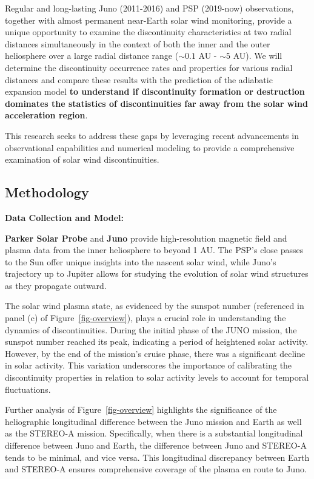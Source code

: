 \documentclass[
  letterpaper,
  DIV=11,
  numbers=noendperiod]{scrartcl}
\begin{document}
Regular and long-lasting Juno (2011-2016) and PSP (2019-now) observations, together with almost permanent near-Earth solar wind monitoring, provide a unique opportunity to examine the discontinuity characteristics at two radial distances simultaneously in the context of both the inner and the outer heliosphere over a large radial distance range (\(\sim 0.1\) AU - \(\sim 5\) AU). We will determine the discontinuity occurrence rates and properties for various radial distances and compare these results with the prediction of the adiabatic expansion model \textbf{to understand if discontinuity formation or destruction dominates the statistics of discontinuities far away from the solar wind acceleration region}.

This research seeks to address these gaps by leveraging recent advancements in observational capabilities and numerical modeling to provide a comprehensive examination of solar wind discontinuities.

\subsection{Methodology}\label{methodology}

\textbf{Data Collection and Model:}

\textbf{Parker Solar Probe} and \textbf{Juno} provide high-resolution magnetic field and plasma data from the inner heliosphere to beyond 1 AU. The PSP's close passes to the Sun offer unique insights into the nascent solar wind, while Juno's trajectory up to Jupiter allows for studying the evolution of solar wind structures as they propagate outward.

The solar wind plasma state, as evidenced by the sunspot number (referenced in panel (c) of Figure~\ref{fig-overview}), plays a crucial role in understanding the dynamics of discontinuities. During the initial phase of the JUNO mission, the sunspot number reached its peak, indicating a period of heightened solar activity. However, by the end of the mission's cruise phase, there was a significant decline in solar activity. This variation underscores the importance of calibrating the discontinuity properties in relation to solar activity levels to account for temporal fluctuations.

Further analysis of Figure~\ref{fig-overview} highlights the significance of the heliographic longitudinal difference between the Juno mission and Earth as well as the STEREO-A mission. Specifically, when there is a substantial longitudinal difference between Juno and Earth, the difference between Juno and STEREO-A tends to be minimal, and vice versa. This longitudinal discrepancy between Earth and STEREO-A ensures comprehensive coverage of the plasma en route to Juno.
\end{document}
